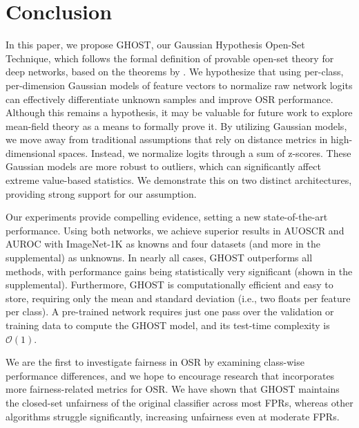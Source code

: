 \section{Conclusion}
\label{sec:conclusion}
In this paper, we propose GHOST, our Gaussian Hypothesis Open-Set Technique, which follows the formal definition of provable open-set theory for deep networks, based on the theorems by \citet{bendale2016openmax}. 
We hypothesize that using per-class, per-dimension Gaussian models of feature vectors to normalize raw network logits can effectively differentiate unknown samples and improve OSR performance.    
Although this remains a hypothesis, it may be valuable for future work to explore mean-field theory as a means to formally prove it. 
By utilizing Gaussian models, we move away from traditional assumptions that rely on distance metrics in high-dimensional spaces.
Instead, we normalize logits through a sum of z-scores.
These Gaussian models are more robust to outliers, which can significantly affect extreme value-based statistics.
We demonstrate this on two distinct architectures, providing strong support for our assumption.

Our experiments provide compelling evidence, setting a new state-of-the-art performance. 
Using both networks, we achieve superior results in AUOSCR and AUROC with ImageNet-1K as knowns and four datasets (and more in the supplemental) as unknowns. 
In nearly all cases, GHOST outperforms all methods, with performance gains being statistically very significant (shown in the supplemental).
Furthermore, GHOST is computationally efficient and easy to store, requiring only the mean and standard deviation (i.e., two floats per feature per class). 
A pre-trained network requires just one pass over the validation or training data to compute the GHOST model, and its test-time complexity is $\mathcal{O}(1)$. 

We are the first to investigate fairness in OSR by examining class-wise performance differences, and we hope to encourage research that incorporates more fairness-related metrics for OSR.
We have shown that GHOST maintains the closed-set unfairness of the original classifier across most FPRs, whereas other algorithms struggle significantly, increasing unfairness even at moderate FPRs.
